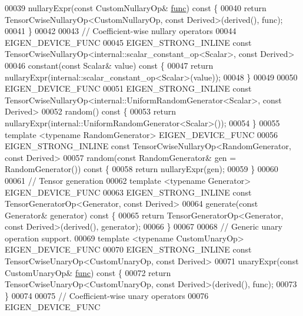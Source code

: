 \begin{DoxyCode}
00039     nullaryExpr(\textcolor{keyword}{const} CustomNullaryOp& \hyperlink{structfunc}{func})\textcolor{keyword}{ const }\{
00040       \textcolor{keywordflow}{return} TensorCwiseNullaryOp<CustomNullaryOp, const Derived>(derived(), func);
00041     \}
00042 
00043     \textcolor{comment}{// Coefficient-wise nullary operators}
00044     EIGEN\_DEVICE\_FUNC
00045     EIGEN\_STRONG\_INLINE \textcolor{keyword}{const} TensorCwiseNullaryOp<internal::scalar\_constant\_op<Scalar>, \textcolor{keyword}{const} Derived>
00046     constant(\textcolor{keyword}{const} Scalar& value)\textcolor{keyword}{ const }\{
00047       \textcolor{keywordflow}{return} nullaryExpr(internal::scalar\_constant\_op<Scalar>(value));
00048     \}
00049 
00050     EIGEN\_DEVICE\_FUNC
00051     EIGEN\_STRONG\_INLINE \textcolor{keyword}{const} TensorCwiseNullaryOp<internal::UniformRandomGenerator<Scalar>, \textcolor{keyword}{const} Derived>
00052     random()\textcolor{keyword}{ const }\{
00053       \textcolor{keywordflow}{return} nullaryExpr(internal::UniformRandomGenerator<Scalar>());
00054     \}
00055     \textcolor{keyword}{template} <\textcolor{keyword}{typename} RandomGenerator> EIGEN\_DEVICE\_FUNC
00056     EIGEN\_STRONG\_INLINE \textcolor{keyword}{const} TensorCwiseNullaryOp<RandomGenerator, const Derived>
00057     random(\textcolor{keyword}{const} RandomGenerator& gen = RandomGenerator())\textcolor{keyword}{ const }\{
00058       \textcolor{keywordflow}{return} nullaryExpr(gen);
00059     \}
00060 
00061     \textcolor{comment}{// Tensor generation}
00062     \textcolor{keyword}{template} <\textcolor{keyword}{typename} Generator> EIGEN\_DEVICE\_FUNC
00063     EIGEN\_STRONG\_INLINE \textcolor{keyword}{const} TensorGeneratorOp<Generator, const Derived>
00064     generate(\textcolor{keyword}{const} Generator& generator)\textcolor{keyword}{ const }\{
00065       \textcolor{keywordflow}{return} TensorGeneratorOp<Generator, const Derived>(derived(), generator);
00066     \}
00067 
00068     \textcolor{comment}{// Generic unary operation support.}
00069     \textcolor{keyword}{template} <\textcolor{keyword}{typename} CustomUnaryOp> EIGEN\_DEVICE\_FUNC
00070     EIGEN\_STRONG\_INLINE \textcolor{keyword}{const} TensorCwiseUnaryOp<CustomUnaryOp, const Derived>
00071     unaryExpr(\textcolor{keyword}{const} CustomUnaryOp& \hyperlink{structfunc}{func})\textcolor{keyword}{ const }\{
00072       \textcolor{keywordflow}{return} TensorCwiseUnaryOp<CustomUnaryOp, const Derived>(derived(), func);
00073     \}
00074 
00075     \textcolor{comment}{// Coefficient-wise unary operators}
00076     EIGEN\_DEVICE\_FUNC

\end{DoxyCode}
